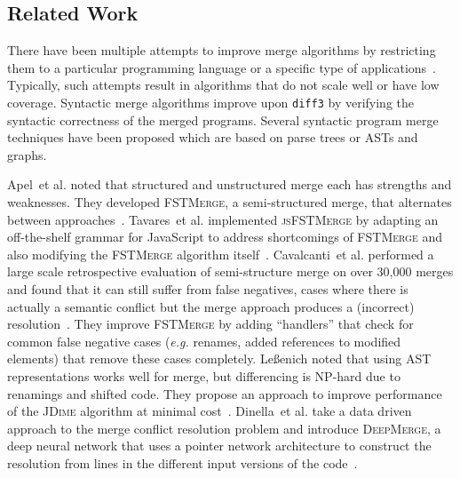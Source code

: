 \subsection{Related Work}

\newcommand{\etal}{et al. }
There have been multiple attempts to improve merge algorithms by restricting them to a particular programming language or a specific type of applications~\citep{mens2002state}. Typically, such attempts result in algorithms that do not scale well or have low coverage. Syntactic merge algorithms improve upon \texttt{diff3} by verifying the syntactic correctness of the merged programs. Several syntactic program merge techniques have been proposed \citep{westfechtel1991structure,Asklund1999IdentifyingCD} which are based on parse trees or ASTs and graphs. 

Apel~\etal noted that structured and unstructured merge each has strengths and weaknesses. 
They developed \textsc{FSTMerge}, a semi-structured merge, that alternates between approaches~\cite{apel2010semistructured}. 
Tavares~\etal implemented \textsc{jsFSTMerge} by adapting an off-the-shelf grammar for JavaScript to address shortcomings of \textsc{FSTMerge} and also modifying the \textsc{FSTMerge} algorithm itself~\cite{tavares2019semistructured}.
 Cavalcanti~\etal performed a large scale retrospective evaluation of semi-structure merge on over 30,000 merges and found that it can still suffer from false negatives, cases where there is actually a semantic conflict but the merge approach produces a (incorrect) resolution~\cite{cavalcanti2017evaluating}. They improve \textsc{FSTMerge} by adding ``handlers'' that check for common false negative cases (\emph{e.g.} renames, added references to modified elements) that remove these cases completely.
Le{\ss}enich noted that using AST representations works well for merge, but differencing is NP-hard due to renamings and shifted code. They propose an approach to improve performance of the \textsc{JDime} algorithm at minimal cost~\cite{lessenich2017renaming}.
Dinella~\etal take a data driven approach to the merge conflict resolution problem and introduce \textsc{DeepMerge}, a deep neural network that uses a pointer network architecture to construct the resolution from lines in the different input versions of the code~\cite{Dinella2021}.

